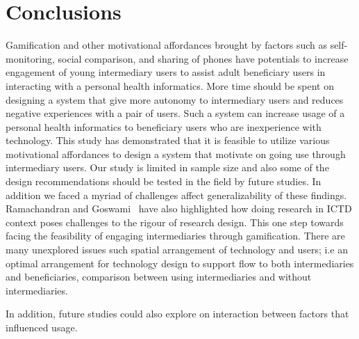 \documentclass{sig-alternate}
\begin{document}
\section{Conclusions}
Gamification and other motivational affordances brought by factors such as self-monitoring, social comparison, and sharing of phones have potentials to increase engagement of young intermediary users to assist adult beneficiary users in interacting with a personal health informatics. More time should be spent on designing a system that give more autonomy to intermediary users and reduces negative experiences with a pair of users. Such a system can increase usage of a personal health informatics to beneficiary users who are inexperience with technology. This study has demonstrated that it is feasible to utilize various motivational affordances to design a system that motivate on going use through intermediary users. Our study is limited in sample size and also some of the design recommendations should be tested in the field by future studies. In addition we faced a myriad of challenges affect generalizability of these findings. Ramachandran and Goswami~\cite{ramachandran2010research} have also highlighted how doing research in ICTD context poses challenges to the rigour of research design. This one step towards facing the feasibility of engaging intermediaries through gamification. There are many unexplored issues such spatial arrangement of technology and users; i.e an optimal arrangement for technology design to support flow to both intermediaries and beneficiaries, comparison between using intermediaries and without intermediaries.


In addition, future studies could also explore on interaction between factors that influenced usage.  



%

%
%
\end{document}
